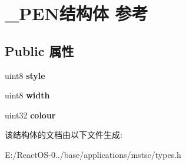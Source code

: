 \hypertarget{struct___p_e_n}{}\section{\+\_\+\+P\+E\+N结构体 参考}
\label{struct___p_e_n}
\subsection*{Public 属性}
\begin{DoxyCompactItemize}
\item 
\mbox{\label{struct___p_e_n_a19fcd85a88e0797d9873d46b0c46991c}} 
uint8 {\bfseries style}
\item 
\mbox{\label{struct___p_e_n_a1ee812ebed38be64a93f6b37e38840be}} 
uint8 {\bfseries width}
\item 
\mbox{\label{struct___p_e_n_af2a7000516ed722045bad64be683b418}} 
uint32 {\bfseries colour}
\end{DoxyCompactItemize}


该结构体的文档由以下文件生成\+:\begin{DoxyCompactItemize}
\item 
E\+:/\+React\+O\+S-\/0../base/applications/mstsc/types.\+h\end{DoxyCompactItemize}
